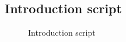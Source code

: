 \documentclass{l4proj}
\begin{document}
\begin{appendices}
\section{Introduction script}
\begin{figure}[H]
\centering
{}
\caption{Introduction script}
\label{appendix:intro}
\end{figure}


\end{appendices}
\end{document}
